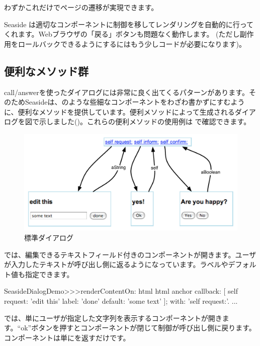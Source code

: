 \documentclass[a4paper,10pt,twoside]{book}
\begin{document}
わずかこれだけでページの遷移が実現できます。

Seaside は適切なコンポーネントに制御を移してレンダリングを自動的に行ってくれます。Webブラウザの「戻る」ボタンも問題なく動作します。 (ただし副作用をロールバックできるようにするにはもう少しコードが必要になります)。

\subsection{便利なメソッド群}

call/answerを使ったダイアログには非常に良く出てくるパターンがあります。そのためSeasideは、のような些細なコンポーネントをわざわ書かずにすむように、便利なメソッドを提供しています。便利メソッドによって生成されるダイアログを図で示しました()。これらの便利メソッドの使用例は で確認できます。

\begin{figure}[b]
\begin{center}
\includegraphics[width=\textwidth]{dialogs}
\caption{標準ダイアログ}
\end{center}
\end{figure}

では、編集できるテキストフィールド付きのコンポーネントが開きます。ユーザが入力したテキストが呼び出し側に返るようになっています。ラベルやデフォルト値も指定できます。

\begin{code}{}
SeasideDialogDemo>>>renderContentOn: html
	html anchor
		callback: [ self request: 'edit this' label: 'done' default: 'some text' ];
		with: 'self request:'.
...
\end{code}

 では、単にユーザが指定した文字列を表示するコンポーネントが開きます。``ok''ボタンを押すとコンポーネントが閉じて制御が呼び出し側に戻ります。コンポーネントは単にを返すだけです。
\end{document}
